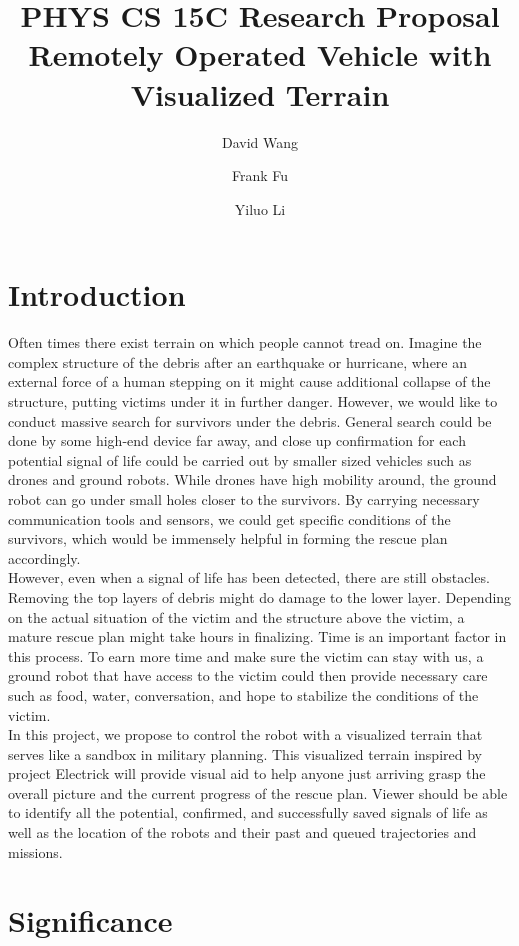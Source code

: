 \documentclass[a4paper,12pt]{article}
\title{\Titlefont PHYS CS 15C Research Proposal\\Remotely Operated Vehicle with Visualized Terrain}
\author[1]{\Authfont David Wang}
\author[1]{\Authfont Frank Fu}
\author[1]{\Authfont Yiluo Li}
\affil[1]{\Affilfont College of Creative Studies, University of California, Santa Barbara}
\begin{document}
\maketitle

\section{Introduction}
Often times there exist terrain on which people cannot tread on. Imagine the complex structure of the debris after an earthquake or hurricane, where an external force of a human stepping on it might cause additional collapse of the structure, putting victims under it in further danger. However, we would like to conduct massive search for survivors under the debris. General search could be done by some high-end device far away, and close up confirmation for each potential signal of life could be carried out by smaller sized vehicles such as drones and ground robots. While drones have high mobility around, the ground robot can go under small holes closer to the survivors. By carrying necessary communication tools and sensors, we could get specific conditions of the survivors, which would be immensely helpful in forming the rescue plan accordingly.
\\\indent However, even when a signal of life has been detected, there are still obstacles. Removing the top layers of debris might do damage to the lower layer. Depending on the actual situation of the victim and the structure above the victim, a mature rescue plan might take hours in finalizing. Time is an important factor in this process. To earn more time and make sure the victim can stay with us, a ground robot that have access to the victim could then provide necessary care such as food, water, conversation, and hope to stabilize the conditions of the victim.
\\\indent In this project, we propose to control the robot with a visualized terrain that serves like a sandbox in military planning. This visualized terrain inspired by project Electrick \cite{Zhang2017} will provide visual aid to help anyone just arriving grasp the overall picture and the current progress of the rescue plan. Viewer should be able to identify all the potential, confirmed, and successfully saved signals of life as well as the location of the robots and their past and queued trajectories and missions.


\section{Significance}
\end{document}
